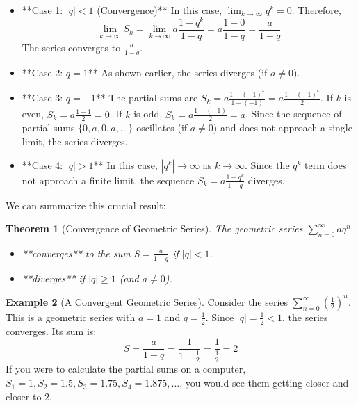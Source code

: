 \documentclass[11pt]{article}
\newtheorem{theorem}{Theorem}[section]
\theoremstyle{definition}
\newtheorem{example}[theorem]{Example}
\theoremstyle{remark}
\begin{document}
\begin{itemize}
    \item **Case 1: $|q| < 1$ (Convergence)**
    In this case, $\lim_{k \to \infty} q^k = 0$. Therefore,
    \[ \lim_{k \to \infty} S_k = \lim_{k \to \infty} a \frac{1 - q^k}{1 - q} = a \frac{1 - 0}{1 - q} = \frac{a}{1 - q} \]
    The series converges to $\frac{a}{1-q}$.

    \item **Case 2: $q = 1$**
    As shown earlier, the series diverges (if $a \neq 0$).

    \item **Case 3: $q = -1$**
    The partial sums are $S_k = a \frac{1 - (-1)^k}{1 - (-1)} = a \frac{1 - (-1)^k}{2}$.
    If $k$ is even, $S_k = a \frac{1-1}{2} = 0$.
    If $k$ is odd, $S_k = a \frac{1-(-1)}{2} = a$.
    Since the sequence of partial sums $\{0, a, 0, a, \dots\}$ oscillates (if $a \neq 0$) and does not approach a single limit, the series diverges.

    \item **Case 4: $|q| > 1$**
    In this case, $|q^k| \to \infty$ as $k \to \infty$. Since the $q^k$ term does not approach a finite limit, the sequence $S_k = a \frac{1 - q^k}{1 - q}$ diverges.
\end{itemize}

We can summarize this crucial result:

\begin{theorem}[Convergence of Geometric Series]
The geometric series $\sum_{n=0}^{\infty} a q^n$
\begin{itemize}
    \item **converges** to the sum $S = \frac{a}{1 - q}$ if $|q| < 1$.
    \item **diverges** if $|q| \ge 1$ (and $a \neq 0$).
\end{itemize}
\end{theorem}

\begin{example}[A Convergent Geometric Series]
Consider the series $\sum_{n=0}^{\infty} \left(\frac{1}{2}\right)^n$.
This is a geometric series with $a=1$ and $q = \frac{1}{2}$. Since $|q| = \frac{1}{2} < 1$, the series converges. Its sum is:
\[ S = \frac{a}{1 - q} = \frac{1}{1 - \frac{1}{2}} = \frac{1}{\frac{1}{2}} = 2 \]
If you were to calculate the partial sums on a computer, $S_1=1, S_2=1.5, S_3=1.75, S_4=1.875, \dots$, you would see them getting closer and closer to 2.
\end{example}
\end{document}
